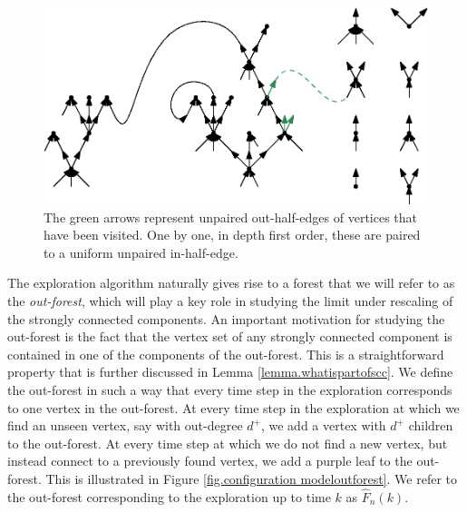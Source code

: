 \begin{figure}
    \centering
    \includegraphics[scale=0.6]{Content/Pictures/configuration_model.eps}
    \caption{The green arrows represent unpaired out-half-edges of vertices that have been visited. One by one, in depth first order, these are paired to a uniform unpaired in-half-edge.}
    \label{fig.configuration model}
\end{figure}

The exploration algorithm naturally gives rise to a forest that we will refer to as the \emph{out-forest}, which will play a key role in studying the limit under rescaling of the strongly connected components. An important motivation for studying the out-forest is the fact that the vertex set of any strongly connected component is contained in one of the components of the out-forest. This is a straightforward property that is further discussed in Lemma \ref{lemma.whatispartofscc}. We define the out-forest in such a way that every time step in the exploration corresponds to one vertex in the out-forest. At every time step in the exploration at which we find an unseen vertex, say with out-degree $d^+$, we add a vertex with $d^+$ children to the out-forest. At every time step at which we do not find a new vertex, but instead connect to a previously found vertex, we add a purple leaf to the out-forest. This is illustrated in Figure \ref{fig.configuration modeloutforest}. We refer to the out-forest corresponding to the exploration up to time $k$ as $\hat{F}_n(k)$.

